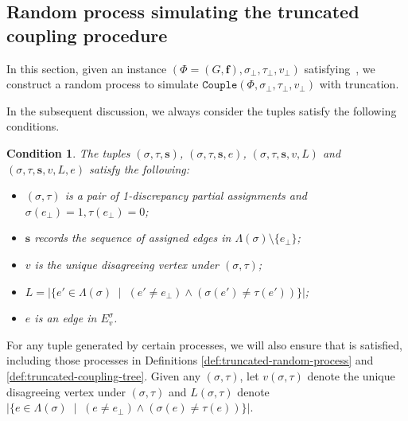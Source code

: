 \documentclass[11pt]{article}
\newtheorem{condition}{Condition}
\newcommand{\abs}[1]{\left\vert#1\right\vert}
\renewcommand{\mid}{\;\middle\vert\;} \newcommand{\cmid}{\,:\,}
\def\!#1{\mathtt{#1}}
\newcommand{\vecf}{\boldsymbol{f}}
\newcommand{\seqS}{\boldsymbol{s}}
\begin{document}
    

\subsection{Random process simulating the truncated coupling procedure}

In this section, given an instance $(\Phi = (G, \vecf), \sigma_\bot, \tau_\bot, v_\bot)$ satisfying~, we construct a random process to simulate $\!{Couple}(\Phi, \sigma_\bot, \tau_\bot, v_\bot)$ with truncation. 

In the subsequent discussion, we always consider the tuples satisfy the following conditions.
\begin{condition}\label{condition-sigma-tau}
The tuples $(\sigma,\tau,\seqS)$, $(\sigma,\tau,\seqS,e)$,  $(\sigma,\tau,\seqS, v, L)$ and $(\sigma,\tau,\seqS, v, L,e)$ satisfy the following:
\begin{itemize}
\item $(\sigma, \tau)$ is a pair of 1-discrepancy partial assignments and $\sigma(e_\bot) = 1, \tau(e_\bot) = 0$;
\item $\seqS$ records the sequence of assigned edges in $\Lambda(\sigma)\setminus \{e_\bot\}$;
\item $v$ is the unique disagreeing vertex under $(\sigma, \tau)$;
\item $L = \abs{\{e'\in \Lambda(\sigma)\mid (e'\neq e_{\bot})\land (\sigma(e')\neq \tau(e'))\}}$;
\item $e$ is an edge in $E^{\sigma}_v$.
\end{itemize}
\end{condition}
For any tuple generated by certain processes, we will also ensure that  is satisfied, including those processes in Definitions  \ref{def:truncated-random-process} and \ref{def:truncated-coupling-tree}.
Given any $(\sigma,\tau)$, let $v(\sigma,\tau)$ denote the unique disagreeing vertex under $(\sigma, \tau)$ and $L(\sigma,\tau)$ denote $\abs{\{e\in \Lambda(\sigma)\mid (e\neq e_{\bot})\land (\sigma(e)\neq \tau(e))\}}$.
\end{document}
